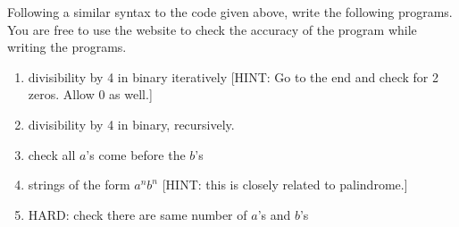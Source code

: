 \documentclass[answers]{exam}
\begin{document}
    Following a similar syntax to the code given above, write the following programs. You are free to use the website to check the accuracy of the program while writing the programs.
    \begin{enumerate}
        \item divisibility by 4 in binary iteratively [HINT: Go to the end and check for 2 zeros. Allow 0 as well.]
        \begin{solution}
            \vspace*{520pt}
        \end{solution}
        
        \item divisibility by 4 in binary, recursively.
        \begin{solution}
            \vspace*{570pt}
        \end{solution}
        
        \item check all $a$'s come before the $b$'s
        \begin{solution}
            \vspace*{570pt}
        \end{solution}
        
        \item strings of the form $a^n b^n$ [HINT: this is closely related to palindrome.]
        \begin{solution}
            \vspace*{570pt}
        \end{solution}

        \item HARD: check there are same number of $a$'s and $b$'s
        \begin{solution}
            \vspace*{560pt}
        \end{solution}
    \end{enumerate}
    
    
\end{document}
